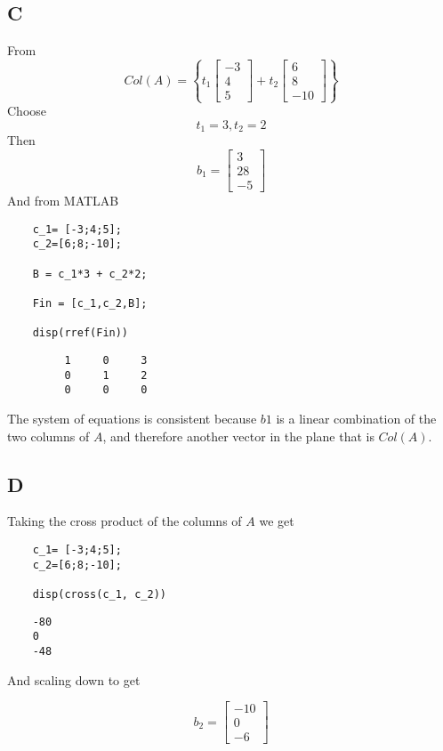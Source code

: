 \documentclass{article}
\begin{document}
\subsection*{C}

From
\[
	Col(A) = \left\{ t_1 \begin{bmatrix} -3 \\ 4 \\ 5 \end{bmatrix} + t_2 \begin{bmatrix} 6 \\ 8 \\ -10 \end{bmatrix} \right\}
\]
Choose
\[
	t_1=3 , t_2=2
\]
Then
\[
	b_1=
	\begin{bmatrix}
		3 \\28\\-5
	\end{bmatrix}
\]
And from MATLAB

\begin{verbatim}
	c_1= [-3;4;5];
	c_2=[6;8;-10];
	
	B = c_1*3 + c_2*2;
	
	Fin = [c_1,c_2,B];
	
	disp(rref(Fin))
	\end{verbatim}

\color{black} \begin{verbatim}     
		 1     0     3
		 0     1     2
		 0     0     0
\end{verbatim} \color{black}

The system of equations is consistent because \(b1\) is a linear combination of the two columns of \(A\), and therefore another vector in the plane that is \(Col(A)\).

\subsection*{D}

Taking the cross product of the columns of \(A\) we get


\begin{verbatim}
	c_1= [-3;4;5];
	c_2=[6;8;-10];
	
	disp(cross(c_1, c_2))
	\end{verbatim}
\color{black}
\begin{verbatim}   
	-80
	0
	-48
\end{verbatim} \color{black}

And scaling down to get

\[
	b_2=
	\begin{bmatrix}
		-10 \\ 0 \\ -6
	\end{bmatrix}
\]
\end{document}
